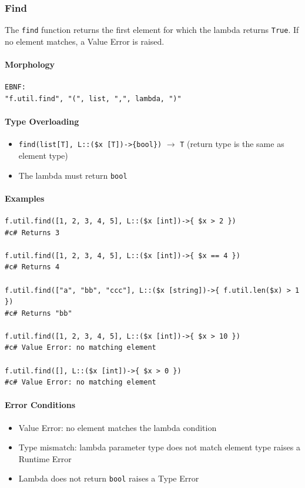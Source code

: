 \subsubsection{Find}
The \texttt{find} function returns the first element for which the lambda returns \texttt{True}. If no element matches, a Value Error is raised.

\paragraph{Morphology}
\begin{verbatim}
EBNF:
"f.util.find", "(", list, ",", lambda, ")"
\end{verbatim}

\paragraph{Type Overloading}
\begin{itemize}
\item \texttt{find(list[T], L::(\$x [T])->\{bool\})} $\rightarrow$ \texttt{T}
  (return type is the same as element type)
\item The lambda must return \texttt{bool}
\end{itemize}

\paragraph{Examples}
\begin{verbatim}
f.util.find([1, 2, 3, 4, 5], L::($x [int])->{ $x > 2 })
#c# Returns 3

f.util.find([1, 2, 3, 4, 5], L::($x [int])->{ $x == 4 })
#c# Returns 4

f.util.find(["a", "bb", "ccc"], L::($x [string])->{ f.util.len($x) > 1 })
#c# Returns "bb"

f.util.find([1, 2, 3, 4, 5], L::($x [int])->{ $x > 10 })
#c# Value Error: no matching element

f.util.find([], L::($x [int])->{ $x > 0 })
#c# Value Error: no matching element
\end{verbatim}

\paragraph{Error Conditions}
\begin{itemize}
\item Value Error: no element matches the lambda condition
\item Type mismatch: lambda parameter type does not match element type raises a Runtime Error
\item Lambda does not return \texttt{bool} raises a Type Error
\end{itemize}


